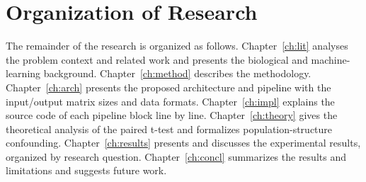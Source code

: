 \documentclass[../main.tex]{subfiles}
\begin{document}
\section{Organization of Research}

The remainder of the research is organized as follows. Chapter~\ref{ch:lit} analyses the problem context and related work and presents the biological and machine-learning background. Chapter~\ref{ch:method} describes the methodology. Chapter~\ref{ch:arch} presents the proposed architecture and pipeline with the input/output matrix sizes and data formats. Chapter~\ref{ch:impl} explains the source code of each pipeline block line by line. Chapter~\ref{ch:theory} gives the theoretical analysis of the paired t-test and formalizes population-structure confounding. Chapter~\ref{ch:results} presents and discusses the experimental results, organized by research question. Chapter~\ref{ch:concl} summarizes the results and limitations and suggests future work.
\end{document}
